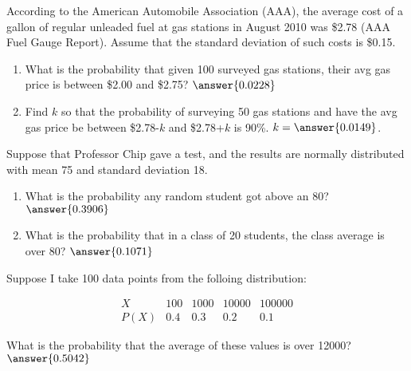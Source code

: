 \documentclass{ximera}
\begin{document}
\begin{problem}
According to the American Automobile Association (AAA), the average cost of a gallon of regular unleaded fuel at gas stations in August 2010 was \$2.78 (AAA Fuel Gauge Report). Assume that the standard deviation of such costs is \$0.15. 
\begin{enumerate}
\item What is the probability that given 100 surveyed gas stations, their avg gas price is between \$2.00 and \$2.75?  $\answer{0.0228}$
\item Find $k$ so that the probability of surveying 50 gas stations and have the avg gas price be between \$2.78-$k$ and \$2.78+$k$ is 90\%.  $k=\answer{0.0149}$.
\end{enumerate}

\end{problem}


\begin{problem}
Suppose that Professor Chip gave a test, and the results are normally distributed with mean 75 and standard deviation 18.

\begin{enumerate}
\item What is the probability any random student got above an 80? $\answer{0.3906}$
\item What is the probability that in a class of 20 students, the class average is over 80? $\answer{0.1071}$
\end{enumerate}

\end{problem}


\begin{problem}
Suppose I take 100 data points from the folloing distribution:

$$\begin{array}{c|cccc}
X&100&1000&10000&100000\\
\hline
P(X)&0.4&0.3&0.2&0.1
\end{array}$$

What is the probability that the average of these values is over 12000?  $\answer{0.5042}$

\end{problem}
\end{document}
